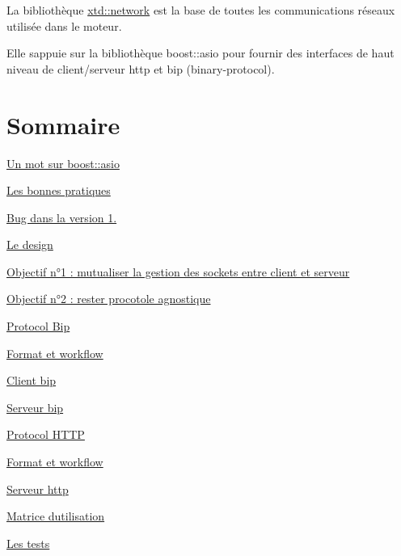 La bibliothèque \hyperlink{namespacextd_1_1network}{xtd\+::network} est la base de toutes les communications réseaux utilisée dans le moteur.

Elle s\textquotesingle{}appuie sur la bibliothèque boost\+::asio pour fournir des interfaces de haut niveau de client/serveur http et bip (binary-\/protocol).\hypertarget{index_sec_main}{}\section{Sommaire}\label{index_sec_main}


 
\begin{DoxyEnumerate}
\item \hyperlink{index_sec_boost}{Un mot sur boost\+::asio} 
\begin{DoxyEnumerate}
\item \hyperlink{index_ssec_boost_practice}{Les bonnes pratiques}  
\item \hyperlink{index_ssec_boost_bug}{Bug dans la version 1.}  
\end{DoxyEnumerate}


\item \hyperlink{index_sec_design}{Le design} 
\begin{DoxyEnumerate}
\item \hyperlink{index_ssec_design_obj1}{Objectif n°1 \+: mutualiser la gestion des sockets entre client et serveur}  
\item \hyperlink{index_ssec_design_obj2}{Objectif n°2 \+: rester procotole agnostique}  
\end{DoxyEnumerate}


\item \hyperlink{index_sec_bip}{Protocol Bip} 
\begin{DoxyEnumerate}
\item \hyperlink{index_ssec_bip_cnx}{Format et workflow}  
\item \hyperlink{index_ssec_bip_client}{Client bip}  
\item \hyperlink{index_ssec_bip_server}{Serveur bip}  
\end{DoxyEnumerate}


\item \hyperlink{index_sec_http}{Protocol H\+T\+TP} 
\begin{DoxyEnumerate}
\item \hyperlink{index_ssec_http_cnx}{Format et workflow}  
\item \hyperlink{index_ssec_http_server}{Serveur http}  
\end{DoxyEnumerate}


\item \hyperlink{index_sec_usages}{Matrice d\textquotesingle{}utilisation} 


\item \hyperlink{index_sec_tests}{Les tests}  
\end{DoxyEnumerate}~\newline
~\newline




